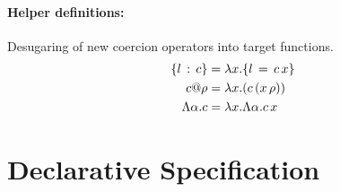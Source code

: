 \documentclass{article}
\begin{document}
\vspace{1cm}
\paragraph{Helper definitions:}
Desugaring of new coercion operators into target functions.
\begin{align*}
  \{l\,:\,c\}    &= \lambda x.\{l\,=\,c\,x\}\\
  c @ \rho   &= \lambda x.(c\,(x\,\rho))\\
  \Lambda \alpha.c &= \lambda x.\Lambda \alpha.c\, x
\end{align*}

\section{Declarative Specification}
\end{document}
